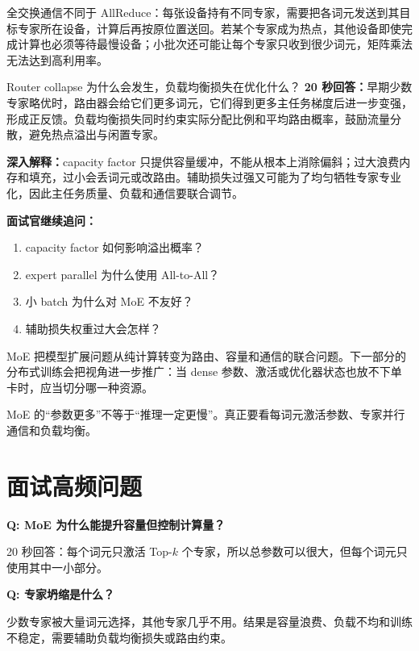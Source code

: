 全交换通信不同于 AllReduce：每张设备持有不同专家，需要把各词元发送到其目标专家所在设备，计算后再按原位置送回。若某个专家成为热点，其他设备即使完成计算也必须等待最慢设备；小批次还可能让每个专家只收到很少词元，矩阵乘法无法达到高利用率。

\begin{interviewbox}{Router collapse 为什么会发生，负载均衡损失在优化什么？}
\textbf{20 秒回答：}早期少数专家略优时，路由器会给它们更多词元，它们得到更多主任务梯度后进一步变强，形成正反馈。负载均衡损失同时约束实际分配比例和平均路由概率，鼓励流量分散，避免热点溢出与闲置专家。

\textbf{深入解释：}capacity factor 只提供容量缓冲，不能从根本上消除偏斜；过大浪费内存和填充，过小会丢词元或改路由。辅助损失过强又可能为了均匀牺牲专家专业化，因此主任务质量、负载和通信要联合调节。

\textbf{面试官继续追问：}
\begin{enumerate}
  \item capacity factor 如何影响溢出概率？
  \item expert parallel 为什么使用 All-to-All？
  \item 小 batch 为什么对 MoE 不友好？
  \item 辅助损失权重过大会怎样？
\end{enumerate}
\end{interviewbox}

MoE 把模型扩展问题从纯计算转变为路由、容量和通信的联合问题。下一部分的分布式训练会把视角进一步推广：当 dense 参数、激活或优化器状态也放不下单卡时，应当切分哪一种资源。

\begin{pitfallbox}
MoE 的“参数更多”不等于“推理一定更慢”。真正要看每词元激活参数、专家并行通信和负载均衡。
\end{pitfallbox}

\section*{面试高频问题}

\textbf{Q: MoE 为什么能提升容量但控制计算量？}

20 秒回答：每个词元只激活 Top-$k$ 个专家，所以总参数可以很大，但每个词元只使用其中一小部分。

\textbf{Q: 专家坍缩是什么？}

少数专家被大量词元选择，其他专家几乎不用。结果是容量浪费、负载不均和训练不稳定，需要辅助负载均衡损失或路由约束。
